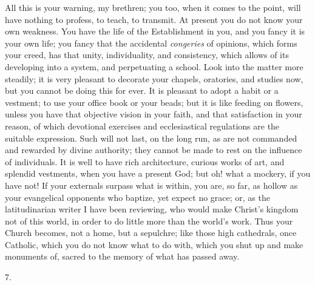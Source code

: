 All this is your warning, my brethren; you too, when it comes to
the point, will have nothing to profess, to teach, to transmit. At
present you do not know your own weakness. You have the life of the
Establishment in you, and you fancy it is your own life; you fancy
that the accidental \emph{congeries} of opinions, which forms your
creed, has that unity, individuality, and consistency, which allows of
its developing into a system, and perpetuating a school. Look into the
matter more steadily; it is very pleasant to decorate your chapels,
oratories, and studies now, but you cannot be doing this for ever. It
is pleasant to adopt a habit or a vestment; to use your office book or
your beads; but it is like feeding on flowers, unless you have that
objective vision in your faith, and that satisfaction in your reason,
of which devotional exercises and ecclesiastical regulations are the
suitable expression. Such will not last, on the long run, as are not
commanded and rewarded by divine authority; they cannot be made to
rest on the influence of individuals. It is well to have rich
architecture, curious works of art, and splendid vestments, when you
have a present God; but oh! what a mockery, if you have not! If your
externals surpass what is within, you are, so far, as hollow as your
evangelical opponents who baptize, yet expect no grace; or, as the
latitudinarian writer I have been reviewing, who would make Christ's
kingdom not of this world, in order to do little more than the
world's work. Thus your Church becomes, not a home, but a sepulchre;
like those high cathedrals, once Catholic, which you do not know what
to do with, which you shut up and make monuments of, sacred to the
memory of what has passed away.

7.

